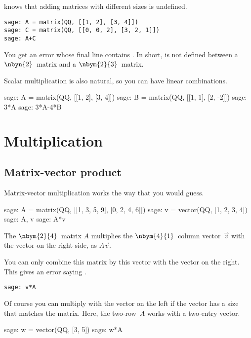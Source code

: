 \Sage{} knows that adding matrices with different sizes is undefined.
\begin{lstlisting}
sage: A = matrix(QQ, [[1, 2], [3, 4]])
sage: C = matrix(QQ, [[0, 0, 2], [3, 2, 1]])
sage: A+C
\end{lstlisting}
You get an error whose final line contains 
.
In short, \inlinecode{+} is not defined between a
$\nbyn{2}$~matrix and a $\nbym{2}{3}$~matrix.

Scalar multiplication is also natural,
so you can have linear combinations.
\begin{sagecommandline}[d,0,2]
sage: A = matrix(QQ, [[1, 2], [3, 4]])
sage: B = matrix(QQ, [[1, 1], [2, -2]])
sage: 3*A
sage: 3*A-4*B
\end{sagecommandline}



\section{Multiplication}

\subsection{Matrix-vector product}
Matrix-vector multiplication works the way that you would guess.
\begin{sagecommandline}
sage: A = matrix(QQ, [[1, 3, 5, 9], [0, 2, 4, 6]])
sage: v = vector(QQ, [1, 2, 3, 4])
sage: A, v
sage: A*v
\end{sagecommandline}
The $\nbym{2}{4}$~matrix $A$ multiplies the 
$\nbym{4}{1}$~column vector~$\vec{v}$ with the vector on the right side,
as $A\vec{v}$.

You can only combine this matrix by this vector with the vector on the right.
This
gives an error saying 
.
\begin{lstlisting}
sage: v*A
\end{lstlisting}

Of course you can multiply with the vector on the left
if the vector has a size that 
matches the matrix.
Here, the two-row~$A$ works with a two-entry vector.
\begin{sagecommandline}
sage: w = vector(QQ, [3, 5])
sage: w*A
\end{sagecommandline}




